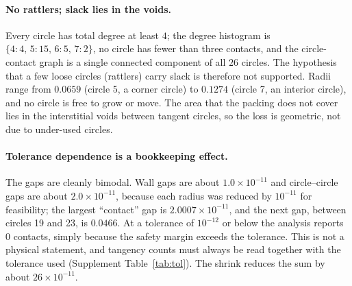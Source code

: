 \documentclass{article} %
\begin{document}
\paragraph{No rattlers; slack lies in the voids.} Every circle has total degree at least $4$; the degree histogram is $\{4{:}4,\,5{:}15,\,6{:}5,\,7{:}2\}$, no circle has fewer than three contacts, and the circle-contact graph is a single connected component of all $26$ circles. The hypothesis that a few loose circles (rattlers) carry slack is therefore not supported. Radii range from $0.0659$ (circle 5, a corner circle) to $0.1274$ (circle 7, an interior circle), and no circle is free to grow or move. The area that the packing does not cover lies in the interstitial voids between tangent circles, so the loss is geometric, not due to under-used circles.

\paragraph{Tolerance dependence is a bookkeeping effect.} The gaps are cleanly bimodal. Wall gaps are about $1.0\times10^{-11}$ and circle--circle gaps are about $2.0\times10^{-11}$, because each radius was reduced by $10^{-11}$ for feasibility; the largest ``contact'' gap is $2.0007\times10^{-11}$, and the next gap, between circles 19 and 23, is $0.0466$. At a tolerance of $10^{-12}$ or below the analysis reports $0$ contacts, simply because the safety margin exceeds the tolerance. This is not a physical statement, and tangency counts must always be read together with the tolerance used (Supplement Table~\ref{tab:tol}). The shrink reduces the sum by about $26\times10^{-11}$.
\end{document}
